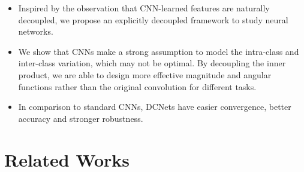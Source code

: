 \begin{itemize}[leftmargin=*,nosep,nolistsep]
    \item Inspired by the observation that CNN-learned features are naturally decoupled, we propose an explicitly decoupled framework to study neural networks.
    \item We show that CNNs make a strong assumption to model the intra-class and inter-class variation, which may not be optimal. By decoupling the inner product, we are able to design more effective magnitude and angular functions rather than the original convolution for different tasks.
    \item In comparison to standard CNNs, DCNets have easier convergence, better accuracy and stronger robustness.
\end{itemize}

\section{Related Works}

